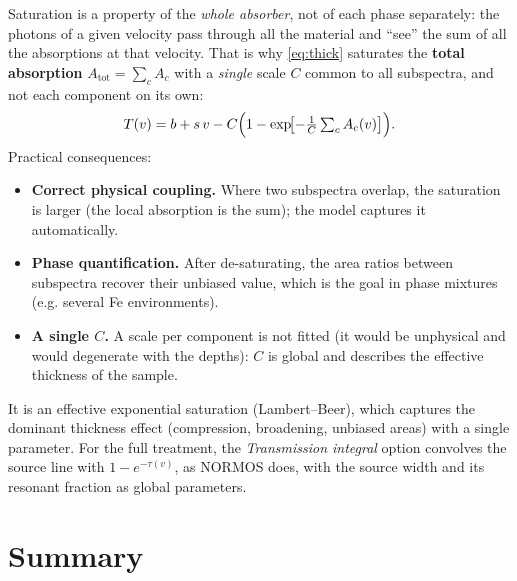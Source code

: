 Saturation is a property of the \emph{whole absorber}, not of each phase
separately: the photons of a given velocity pass through all the material and
``see'' the sum of all the absorptions at that velocity. That is why \eqref{eq:thick}
saturates the \textbf{total absorption} $A_{\text{tot}}=\sum_c A_c$ with a
\emph{single} scale $C$ common to all subspectra, and not each component
on its own:
\begin{equation}
  T(v) = b + s\,v - C\Bigl(1 - \exp\!\bigl[-\tfrac{1}{C}\textstyle\sum_c A_c(v)\bigr]\Bigr).
\end{equation}
Practical consequences:
\begin{itemize}[leftmargin=*]
  \item \textbf{Correct physical coupling.} Where two subspectra overlap, the
        saturation is larger (the local absorption is the sum); the model captures it
        automatically.
  \item \textbf{Phase quantification.} After de-saturating, the area ratios
        between subspectra recover their unbiased value, which is the goal in
        phase mixtures (e.g. several Fe environments).
  \item \textbf{A single $C$.} A scale per component is not fitted (it would be
        unphysical and would degenerate with the depths): $C$ is global and describes the
        effective thickness of the sample.
\end{itemize}

\begin{nota}
It is an effective exponential saturation (Lambert–Beer), which captures the
dominant thickness effect (compression, broadening, unbiased areas) with a single
parameter. For the full treatment, the \emph{Transmission integral} option
convolves the source line with $1-e^{-\tau(v)}$, as NORMOS does, with the source
width and its resonant fraction as global parameters.
\end{nota}

\section{Summary}

